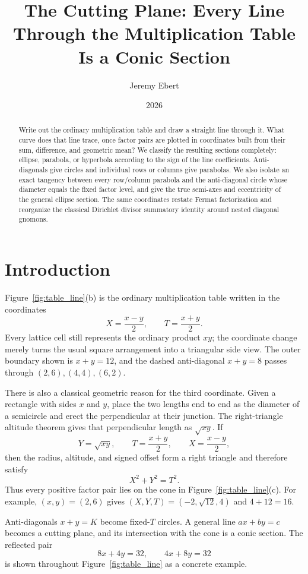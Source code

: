 \documentclass[11pt]{amsart}
\title{The Cutting Plane: Every Line Through the Multiplication Table Is a Conic Section}
\author{Jeremy Ebert}
\date{2026}
\theoremstyle{remark}
\begin{document}
\maketitle

\begin{abstract}
Write out the ordinary multiplication table and draw a straight line through it. What curve does that line trace, once factor pairs are plotted in coordinates built from their sum, difference, and geometric mean? We classify the resulting sections completely: ellipse, parabola, or hyperbola according to the sign of the line coefficients. Anti-diagonals give circles and individual rows or columns give parabolas. We also isolate an exact tangency between every row/column parabola and the anti-diagonal circle whose diameter equals the fixed factor level, and give the true semi-axes and eccentricity of the general ellipse section. The same coordinates restate Fermat factorization and reorganize the classical Dirichlet divisor summatory identity around nested diagonal gnomons.
\end{abstract}

\section{Introduction}
Figure~\ref{fig:table_line}(b) is the ordinary multiplication table written in the coordinates
\[
X=\frac{x-y}{2},\qquad T=\frac{x+y}{2}.
\]
Every lattice cell still represents the ordinary product $xy$; the coordinate change merely turns the usual square arrangement into a triangular side view. The outer boundary shown is $x+y=12$, and the dashed anti-diagonal $x+y=8$ passes through $(2,6),(4,4),(6,2)$.

There is also a classical geometric reason for the third coordinate. Given a rectangle with sides $x$ and $y$, place the two lengths end to end as the diameter of a semicircle and erect the perpendicular at their junction. The right-triangle altitude theorem gives that perpendicular length as $\sqrt{xy}$. If
\[
Y=\sqrt{xy},\qquad T=\frac{x+y}{2},\qquad X=\frac{x-y}{2},
\]
then the radius, altitude, and signed offset form a right triangle and therefore satisfy
\[
X^2+Y^2=T^2.
\]
Thus every positive factor pair lies on the cone in Figure~\ref{fig:table_line}(c). For example, $(x,y)=(2,6)$ gives $(X,Y,T)=(-2,\sqrt{12},4)$ and $4+12=16$.

Anti-diagonals $x+y=K$ become fixed-$T$ circles. A general line $ax+by=c$ becomes a cutting plane, and its intersection with the cone is a conic section. The reflected pair
\[
8x+4y=32,\qquad 4x+8y=32
\]
is shown throughout Figure~\ref{fig:table_line} as a concrete example.
\end{document}
